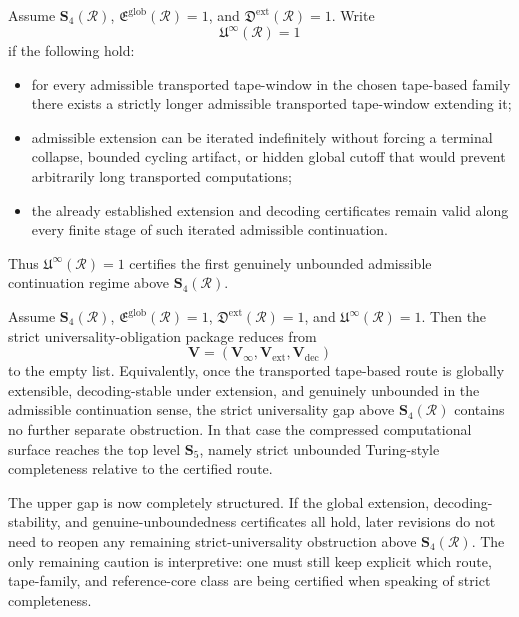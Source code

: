 \begin{definition}
Assume \(\mathbf S_4(\mathcal R)\), \(\mathfrak E^{\mathrm{glob}}(\mathcal R)=1\), and \(\mathfrak D^{\mathrm{ext}}(\mathcal R)=1\).
Write
\[
\mathfrak U^{\infty}(\mathcal R)=1
\]
if the following hold:
\begin{itemize}[leftmargin=2em]
  \item for every admissible transported tape-window in the chosen tape-based family there exists a strictly longer admissible transported tape-window extending it;
  \item admissible extension can be iterated indefinitely without forcing a terminal collapse, bounded cycling artifact, or hidden global cutoff that would prevent arbitrarily long transported computations;
  \item the already established extension and decoding certificates remain valid along every finite stage of such iterated admissible continuation.
\end{itemize}
Thus \(\mathfrak U^{\infty}(\mathcal R)=1\) certifies the first genuinely unbounded admissible continuation regime above \(\mathbf S_4(\mathcal R)\).
\end{definition}

\begin{proposition}
Assume \(\mathbf S_4(\mathcal R)\), \(\mathfrak E^{\mathrm{glob}}(\mathcal R)=1\), \(\mathfrak D^{\mathrm{ext}}(\mathcal R)=1\), and \(\mathfrak U^{\infty}(\mathcal R)=1\). Then the strict universality-obligation package reduces from
\[
\mathbf V=(\mathbf V_\infty,\mathbf V_{\mathrm{ext}},\mathbf V_{\mathrm{dec}})
\]
to the empty list.
Equivalently, once the transported tape-based route is globally extensible, decoding-stable under extension, and genuinely unbounded in the admissible continuation sense, the strict universality gap above \(\mathbf S_4(\mathcal R)\) contains no further separate obstruction. In that case the compressed computational surface reaches the top level \(\mathbf S_5\), namely strict unbounded Turing-style completeness relative to the certified route.
\end{proposition}

\begin{corollary}
The upper gap is now completely structured. If the global extension, decoding-stability, and genuine-unboundedness certificates all hold, later revisions do not need to reopen any remaining strict-universality obstruction above \(\mathbf S_4(\mathcal R)\). The only remaining caution is interpretive: one must still keep explicit which route, tape-family, and reference-core class are being certified when speaking of strict completeness.
\end{corollary}


